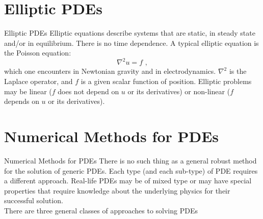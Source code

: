 \documentclass[11pt]{beamer}
\begin{document}


\section{Elliptic PDEs}
\begin{frame}[fragile]{Elliptic PDEs}
Elliptic equations describe systems that are static, in steady state
and/or in equilibrium. There is no time dependence. A typical elliptic
equation is the Poisson equation:
\begin{equation}
\nabla^2 u = f\,\,,
\end{equation}
which one encounters in Newtonian gravity and in electrodynamics.
$\nabla^2$ is the Laplace operator, and $f$ is a given scalar function
of position. Elliptic problems may be linear ($f$ does not depend on
$u$ or its derivatives) or non-linear ($f$ depends on $u$ or its
derivatives).
\end{frame}


\section{Numerical Methods for PDEs}
\begin{frame}[fragile]{Numerical Methods for PDEs}
There is no such thing as a general robust method for the solution of 
generic PDEs. Each type (and each sub-type) of PDE requires a different
approach. Real-life PDEs may be of mixed type or may have special 
properties that require knowledge about the underlying physics for their
successful solution.\\

\bigskip
There are three general classes of approaches to solving PDEs

\end{frame}
\end{document}
